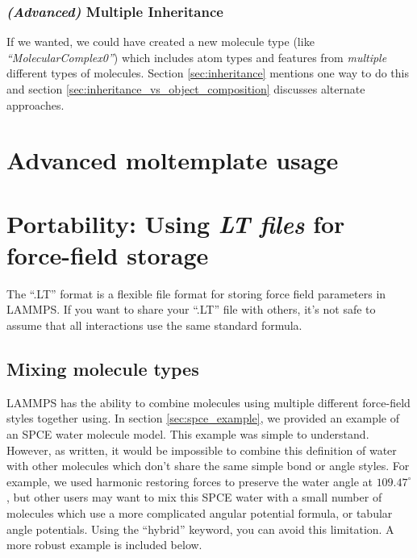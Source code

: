 \documentclass[11pt]{article}
\begin{document}
\subsubsection*{\textit{(Advanced)} Multiple Inheritance}
If we wanted, we could have created a new molecule type 
(like \textit{``MolecularComplex0''}) 
which includes atom types and features from 
\textit{multiple} different types of molecules.
Section \ref{sec:inheritance} mentions one way to do this
and section \ref{sec:inheritance_vs_object_composition}
discusses alternate approaches.








\section*{Advanced moltemplate usage}



\section{Portability: Using \textit{LT files} for force-field storage}
\label{sec:spce_example_robust}
The ``.LT'' format is a flexible file format
for storing force field parameters in LAMMPS.
If you want to share your ``.LT'' file with others, it's 
not safe to assume that all interactions use the same standard formula.

\subsection{Mixing molecule types}
LAMMPS has the ability to combine molecules using multiple different 
force-field styles together using. 
In section \ref{sec:spce_example}, 
we provided an example of an SPCE water molecule model.
This example was simple to understand.
However, as written, it would be impossible to combine this definition of water 
with other molecules which don't share the same simple bond or angle styles.
For example, we used harmonic restoring forces to preserve the water angle 
at $109.47^\circ$, but other users may want to mix this SPCE water with a small 
number of molecules which use a more complicated angular potential formula,
or tabular angle potentials.
Using the ``hybrid'' keyword, you can avoid this limitation. 
A more robust example is included below.
\end{document}
